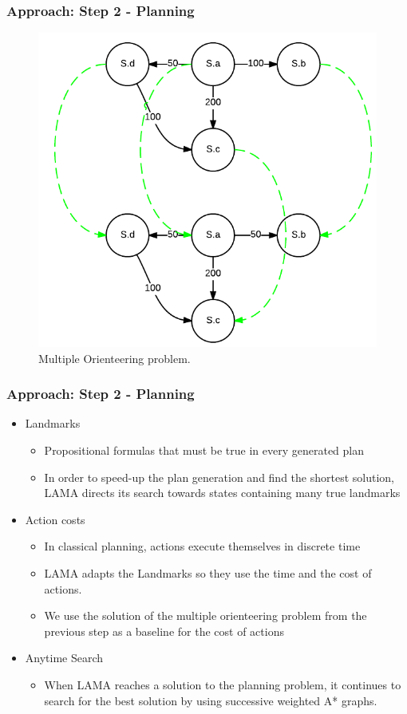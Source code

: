 \documentclass{beamer}
\begin{document}
\begin{frame}
\frametitle{Approach: Step 2 - Planning}
\begin{figure}
    \centering
	\includegraphics[scale=0.35]{media/multiple_orienteering.png}
 	\caption{Multiple Orienteering problem.}
    \label{fig:multiple_orienteering}
\end{figure}
\end{frame}

\begin{frame}
\frametitle{Approach: Step 2 - Planning}
\begin{itemize}

\item Landmarks
\begin{itemize}
\item Propositional formulas that must be true in every generated plan
\item In order to speed-up the plan generation and
find the shortest solution, LAMA directs its search towards states containing
many true landmarks
\end{itemize}
\item Action costs
\begin{itemize}
\item In classical planning, actions  execute themselves in discrete time
\item LAMA adapts the Landmarks so they use the time and the cost of actions.
\item We use the solution of the multiple orienteering problem from the previous step as a baseline for the cost of actions
\end{itemize}
\item Anytime Search
\begin{itemize}
\item When LAMA reaches a solution to the planning problem, it
continues to search for the best solution by using successive weighted A* graphs.
\end{itemize}
\end{itemize}
\end{frame}
\end{document}
